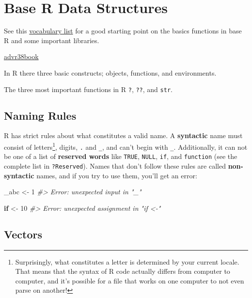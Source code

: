 \documentclass[]{book}
\newenvironment{Shaded}{\begin{snugshade}}{\end{snugshade}}
\newcommand{\DecValTok}[1]{\textcolor[rgb]{0.00,0.00,0.81}{#1}}
\newcommand{\StringTok}[1]{\textcolor[rgb]{0.31,0.60,0.02}{#1}}
\newcommand{\CommentTok}[1]{\textcolor[rgb]{0.56,0.35,0.01}{\textit{#1}}}
\newcommand{\ControlFlowTok}[1]{\textcolor[rgb]{0.13,0.29,0.53}{\textbf{#1}}}
\newcommand{\NormalTok}[1]{#1}
\let\rmarkdownfootnote\footnote%
\def\footnote{\protect\rmarkdownfootnote}
\theoremstyle{definition}
\theoremstyle{definition}
\theoremstyle{definition}
\theoremstyle{remark}
\begin{document}
\chapter{Base R Data Structures}\label{base-r-data-structures}

See this \href{http://adv-r.had.co.nz/Vocabulary.html}{vocabulary list}
for a good starting point on the basics functions in base R and some
important libraries.

\href{https://privefl.github.io/advr38book/r-programming.html}{advr38book}

In R there three basic constructs; objects, functions, and environments.

The three most important functions in R \texttt{?}, \texttt{??}, and
\texttt{str}.

\section{Naming Rules}\label{naming-rules}

R has strict rules about what constitutes a valid name. A
\textbf{syntactic} name must consist of letters\footnote{Surprisingly,
  what constitutes a letter is determined by your current locale. That
  means that the syntax of R code actually differs from computer to
  computer, and it's possible for a file that works on one computer to
  not even parse on another!}, digits, \texttt{.} and \texttt{\_}, and
can't begin with \texttt{\_}. Additionally, it can not be one of a list
of \textbf{reserved words} like \texttt{TRUE}, \texttt{NULL},
\texttt{if}, and \texttt{function} (see the complete list in
\texttt{?Reserved}). Names that don't follow these rules are called
\textbf{non-syntactic} names, and if you try to use them, you'll get an
error:

\begin{Shaded}
\begin{Highlighting}[]
\NormalTok{_abc <-}\StringTok{ }\DecValTok{1}
\CommentTok{#> Error: unexpected input in "_"}

\ControlFlowTok{if}\NormalTok{ <-}\StringTok{ }\DecValTok{10}
\CommentTok{#> Error: unexpected assignment in "if <-"}
\end{Highlighting}
\end{Shaded}

\section{Vectors}\label{vectors}
\end{document}
